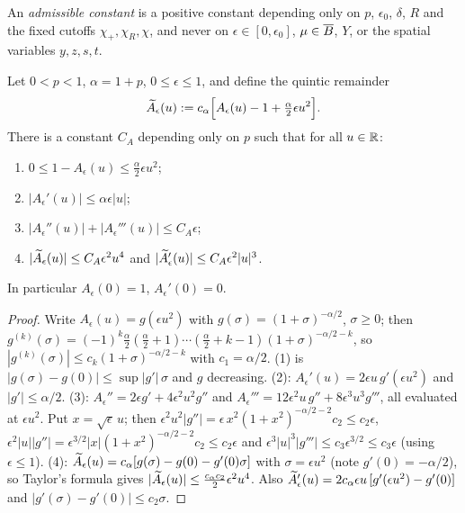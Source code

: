 An \emph{admissible constant} is a positive constant depending only on $p$, $\epsilon_0$, $\delta$, $R$
and the fixed cutoffs $\chi_+,\chi_R,\chi$, and never on $\epsilon\in[0,\epsilon_0]$, $\mu\in\overline{B}$,
$Y$, or the spatial variables $y,z,s,t$.

\begin{lemma}
  \label{lem:c06_A_eps_bounds}
  Let $0<p<1$, $\alpha=1+p$, $0\leq\epsilon\leq1$, and define the quintic remainder
  \[\widetilde{A}_\epsilon(u):=c_\alpha\Bigl[A_\epsilon(u)-1+\tfrac{\alpha}{2}\epsilon u^2\Bigr].\]
  There is a constant $C_A$ depending only on $p$ such that for all $u\in\mathbb{R}$:
  \begin{enumerate}
    \item $0\leq 1-A_\epsilon(u)\leq \frac\alpha2\epsilon u^2$;
    \item $|A_\epsilon'(u)|\leq\alpha\epsilon|u|$;
    \item $|A_\epsilon''(u)|+|A_\epsilon'''(u)|\leq C_A\epsilon$;
    \item $|\widetilde{A}_\epsilon(u)|\leq C_A\epsilon^2u^4$ and $|\widetilde{A}_\epsilon'(u)|\leq C_A\epsilon^2|u|^3$.
  \end{enumerate}
  In particular $A_\epsilon(0)=1$, $A_\epsilon'(0)=0$.
\end{lemma}
\begin{proof}
  Write $A_\epsilon(u)=g(\epsilon u^2)$ with $g(\sigma)=(1+\sigma)^{-\alpha/2}$, $\sigma\geq0$; then
  $g^{(k)}(\sigma)=(-1)^k\frac{\alpha}{2}(\frac\alpha2+1)\cdots(\frac\alpha2+k-1)(1+\sigma)^{-\alpha/2-k}$,
  so $|g^{(k)}(\sigma)|\leq c_k(1+\sigma)^{-\alpha/2-k}$ with $c_1=\alpha/2$.
  (1) is $|g(\sigma)-g(0)|\leq\sup|g'|\,\sigma$ and $g$ decreasing.
  (2): $A_\epsilon'(u)=2\epsilon u\,g'(\epsilon u^2)$ and $|g'|\leq\alpha/2$.
  (3): $A_\epsilon''=2\epsilon g'+4\epsilon^2u^2g''$ and
  $A_\epsilon'''=12\epsilon^2u\,g''+8\epsilon^3u^3g'''$, all evaluated at $\epsilon u^2$. Put $x=\sqrt\epsilon\,u$;
  then $\epsilon^2u^2|g''|=\epsilon\,x^2(1+x^2)^{-\alpha/2-2}c_2\leq c_2\epsilon$,
  $\epsilon^2|u||g''|=\epsilon^{3/2}|x|(1+x^2)^{-\alpha/2-2}c_2\leq c_2\epsilon$ and
  $\epsilon^3|u|^3|g'''|\leq c_3\epsilon^{3/2}\leq c_3\epsilon$ (using $\epsilon\le1$).
  (4): $\widetilde{A}_\epsilon(u)=c_\alpha[g(\sigma)-g(0)-g'(0)\sigma]$ with $\sigma=\epsilon u^2$ (note $g'(0)=-\alpha/2$),
  so Taylor's formula gives $|\widetilde{A}_\epsilon(u)|\leq \frac{c_\alpha c_2}{2}\epsilon^2u^4$. Also
  $\widetilde{A}_\epsilon'(u)=2c_\alpha\epsilon u\,[g'(\epsilon u^2)-g'(0)]$ and $|g'(\sigma)-g'(0)|\leq c_2\sigma$.
\end{proof}

